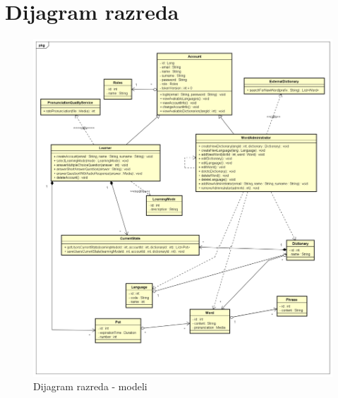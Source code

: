 				\newpage
			
			
		\section{Dijagram razreda}
		
			
			
			
			\begin{figure}[H]
				\includegraphics[width=\textwidth]{slike/ClassDiagram1.PNG}
				\caption{Dijagram razreda - modeli}
				\label{fig:classDiagram1}
			\end{figure}
			
